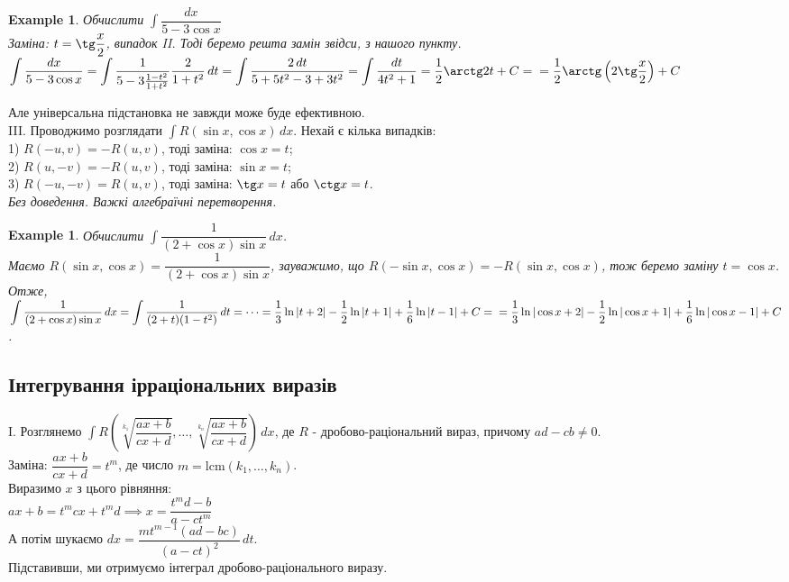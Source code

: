 \documentclass[a4paper, 10pt]{article}
\def\huge{\displaystyle}
\theoremstyle{theoremdd}
\theoremstyle{theoremdd}
\theoremstyle{theoremdd}
\theoremstyle{theoremdd}
\theoremstyle{theoremdd}
\newtheorem{example}[theorem]{Example}
\theoremstyle{theoremdd}
\theoremstyle{theoremdd}
\theoremstyle{theoremdd}
\theoremstyle{theoremdd}
\begin{document}
\begin{example}
Обчислити $\huge \int \dfrac{dx}{5-3\cos x}$\\
Заміна: $t = \tg \dfrac{x}{2}$, випадок II. Тоді беремо решта замін звідси, з нашого пункту.\\
$\huge \int \dfrac{dx}{5-3\cos x} = \int \dfrac{1}{5-3 \frac{1-t^2}{1+t^2}} \dfrac{2}{1+t^2}\,dt = \int \dfrac{2\,dt}{5+5t^2-3+3t^2} = \int \dfrac{dt}{4t^2+1} = \dfrac{1}{2} \arctg 2t + C = \\ = \dfrac{1}{2} \arctg \left(2 \tg \dfrac{x}{2} \right) + C$
\end{example}
Але універсальна підстановка не завжди може буде ефективною.\\
III. Проводжимо розглядати $\huge\int R(\sin x, \cos x) \,dx$. Нехай є кілька випадків:\\
1) $R(-u,v) = -R(u,v)$, тоді заміна: $\cos x = t$;\\
2) $R(u,-v) = -R(u,v)$, тоді заміна: $\sin x = t$;\\
3) $R(-u,-v) = R(u,v)$, тоді заміна: $\tg x = t$ або $\ctg x = t$.\\
\textit{Без доведення. Важкі алгебраїчні перетворення.}

\begin{example}
Обчислити $\huge\int \dfrac{1}{(2+\cos x) \sin x}\,dx$.\\
Маємо $R(\sin x,\cos x) = \dfrac{1}{(2+\cos x)\sin x}$, зауважимо, що $R(-\sin x, \cos x) = -R(\sin x, \cos x)$, тож беремо заміну $t = \cos x$. Отже,\\
$\huge\int \dfrac{1}{(2+\cos x) \sin x}\,dx = \int \dfrac{1}{(2+t)(1-t^2)}\,dt = \dots = \dfrac{1}{3} \ln |t+2| - \dfrac{1}{2} \ln |t+1| + \dfrac{1}{6} \ln |t-1| + C = \\ = \dfrac{1}{3} \ln |\cos x + 2| - \dfrac{1}{2} \ln |\cos x +1| + \dfrac{1}{6} \ln | \cos x - 1| + C$.
\end{example}
\subsection{Інтегрування ірраціональних виразів}

I. Розглянемо $\huge \int R\left( \sqrt[k_1]{\dfrac{ax+b}{cx+d}}, \dots, \sqrt[k_n]{\dfrac{ax+b}{cx+d}} \right)\,dx$, де $R$ - дробово-раціональний вираз, причому $ad-cb \neq 0$.\\
Заміна: $\dfrac{ax+b}{cx+d} = t^m$, де число $m = \text{lcm}(k_1,\dots,k_n)$.\\
Виразимо $x$ з цього рівняння:\\
$ax+b =t^m cx + t^m d \implies x = \dfrac{t^md-b}{a-ct^m}$\\
А потім шукаємо $dx = \dfrac{mt^{m-1}(ad-bc)}{(a-ct)^2}\,dt$.\\
Підставивши, ми отримуємо інтеграл дробово-раціонального виразу.
\end{document}
